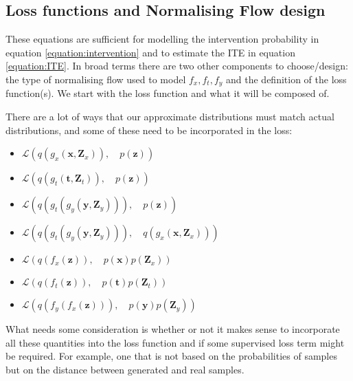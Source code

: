 \documentclass{article}
\newcommand{\Loss}{\mathcal{L}}
\newcommand{\bt}{\mathbf{t}}
\newcommand{\bx}{\mathbf{x}}
\newcommand{\by}{\mathbf{y}}
\newcommand{\bZ}{\mathbf{Z}}
\newcommand{\bz}{\mathbf{z}}
\begin{document}
\subsection{Loss functions and Normalising Flow design}
These equations are sufficient for modelling the intervention probability in equation \ref{equation:intervention} and to estimate the ITE in equation \ref{equation:ITE}. In broad terms there are two other components to choose/design: the type of normalising flow used to model $f_x, f_t, f_y$ and the definition of the loss function(s). We start with the loss function and what it will be composed of.

There are a lot of ways that our approximate distributions must match actual distributions, and some of these need to be incorporated in the loss:
\begin{itemize}
    \item $\Loss(q(g_x(\bx, \bZ_x)),\quad p(\bz))$
    \item $\Loss(q(g_t(\bt, \bZ_t)),\quad p(\bz))$
    \item $\Loss(q(g_t(g_y(\by, \bZ_y))),\quad p(\bz))$
    \item $\Loss(q(g_t(g_y(\by, \bZ_y))),\quad q(g_x(\bx, \bZ_x)))$
    \vspace{0.5cm}
    \item $\Loss(q(f_x(\bz)),\quad p(\bx)p(\bZ_x))$
    \item $\Loss(q(f_t(\bz)),\quad p(\bt)p(\bZ_t))$
    \item $\Loss(q(f_y(f_x(\bz))),\quad p(\by)p(\bZ_y))$
\end{itemize}

What needs some consideration is whether or not it makes sense to incorporate all these quantities into the loss function and if some supervised loss term might be required. For example, one that is not based on the probabilities of samples but on the distance between generated and real samples.





\end{document}
